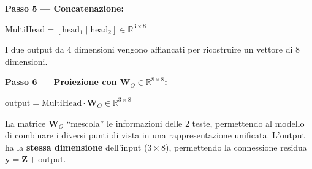 \documentclass[12pt,a4paper]{article}
\begin{document}
\begin{examplebox}
\textbf{Passo 5 --- Concatenazione:}

$\text{MultiHead} = [\text{head}_1 \;|\; \text{head}_2] \in \mathbb{R}^{3 \times 8}$

I due output da 4 dimensioni vengono affiancati per ricostruire un vettore di 8 dimensioni.

\textbf{Passo 6 --- Proiezione con $\mathbf{W}_O \in \mathbb{R}^{8 \times 8}$:}

$\text{output} = \text{MultiHead} \cdot \mathbf{W}_O \in \mathbb{R}^{3 \times 8}$

La matrice $\mathbf{W}_O$ ``mescola'' le informazioni delle 2 teste, permettendo al modello di combinare i diversi punti di vista in una rappresentazione unificata. L'output ha la \textbf{stessa dimensione} dell'input ($3 \times 8$), permettendo la connessione residua $\mathbf{y} = \mathbf{Z} + \text{output}$.
\end{examplebox}
\end{document}
